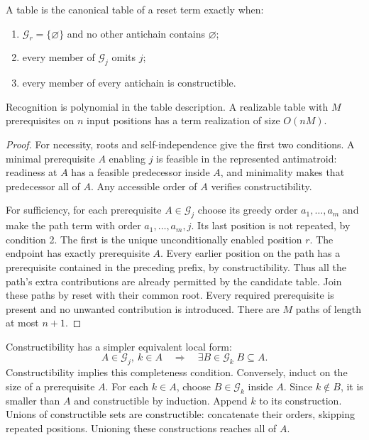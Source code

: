 \begin{proposition}[Realizability]\label{reset:thm:synthesis}
A table is the canonical table of a reset term exactly when:
\begin{enumerate}
\item $\mathcal G_r=\{\varnothing\}$ and no other antichain contains
$\varnothing$;
\item every member of $\mathcal G_j$ omits $j$;
\item every member of every antichain is constructible.
\end{enumerate}
Recognition is polynomial in the table description. A realizable
table with $M$ prerequisites on $n$ input positions has a term
realization of size $O(nM)$.
\end{proposition}
\begin{proof}
For necessity, roots and self-independence give the first two
conditions. A minimal prerequisite $A$ enabling $j$ is feasible in the
represented antimatroid: readiness at $A$ has a feasible predecessor
inside $A$, and minimality makes that predecessor all of $A$.
Any accessible order of $A$ verifies constructibility.

For sufficiency, for each prerequisite $A\in\mathcal G_j$ choose its
greedy order $a_1,\ldots,a_m$ and make the path term with order
$a_1,\ldots,a_m,j$. Its last position is not repeated, by condition 2.
The first is the unique unconditionally enabled position $r$.
The endpoint has exactly prerequisite $A$. Every earlier position on
the path has a prerequisite contained in the preceding prefix, by
constructibility. Thus all the path's extra contributions are already
permitted by the candidate table. Join these paths by reset with their
common root. Every required prerequisite is present and no unwanted
contribution is introduced. There are $M$ paths of length at most
$n+1$.
\end{proof}

Constructibility has a simpler equivalent local form:
\begin{equation}\label{reset:eq:complete}
 A\in\mathcal G_j,\ k\in A
 \quad\Longrightarrow\quad
 \exists B\in\mathcal G_k\; B\subseteq A.
\end{equation}
Constructibility implies this completeness condition. Conversely, induct on the size of a prerequisite $A$. For each $k\in A$, choose $B\in\mathcal G_k$ inside $A$. Since $k\notin B$, it is smaller than $A$ and constructible by induction. Append $k$ to its construction. Unions of constructible sets are
constructible: concatenate their orders, skipping repeated positions. Unioning these constructions reaches all of $A$.

